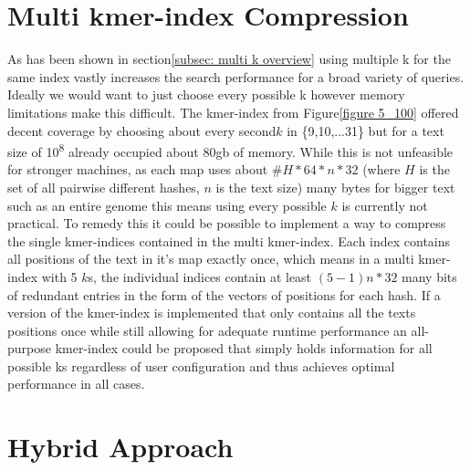 \section{Multi kmer-index Compression}

As has been shown in section\ref{subsec: multi k overview} using
multiple k for the same index vastly increases the search performance
for a broad variety of queries. Ideally we would want to just choose
every possible k however memory limitations make this difficult. The
kmer-index from Figure\ref{figure 5_100} offered decent coverage
by choosing about every second$k$ in \{9,10,...31\} but for a text
size of 10\textsuperscript{8} already occupied about 80gb of memory.
While this is not unfeasible for stronger machines, as each map uses
about $\#H*64*n*32$ (where $H$ is the set of all pairwise different
hashes, $n$ is the text size) many bytes for bigger text such
as an entire genome this means using every possible $k$ is currently not
practical. To remedy this it could be possible to implement a way
to compress the single kmer-indices contained in the multi kmer-index.
Each index contains all positions of the text in it's map exactly
once, which means in a multi kmer-index with 5 $k$s, the individual indices
contain at least $(5-1)n*32$ many bits of redundant entries in the
form of the vectors of positions for each hash. If a version of the
kmer-index is implemented that only contains all the texts positions
once while still allowing for adequate runtime performance an all-purpose
kmer-index could be proposed that simply holds information for all
possible ks regardless of user configuration and thus achieves optimal
performance in all cases.

\section{Hybrid Approach}

